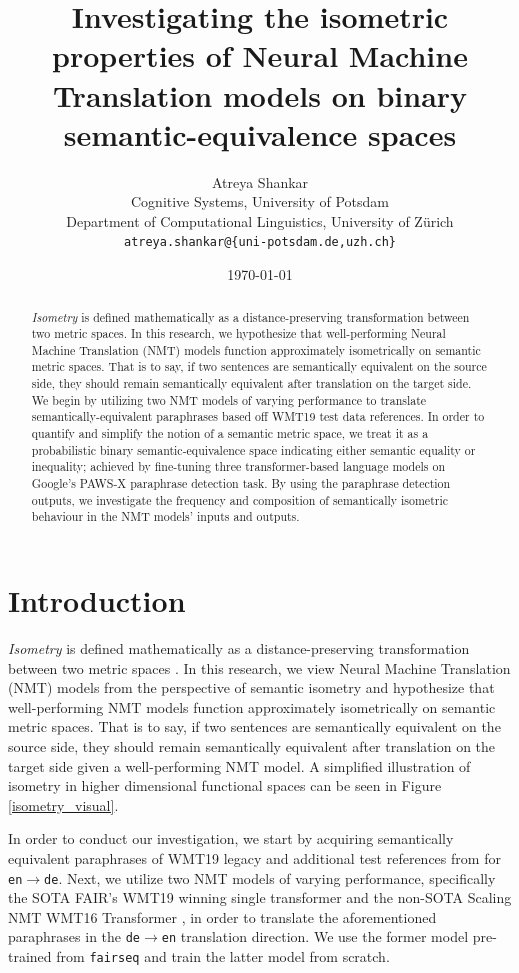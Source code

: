 \documentclass[11pt,a4paper]{article}
\title{Investigating the isometric properties of Neural Machine Translation models on binary semantic-equivalence spaces}
\author{Atreya Shankar \\
  Cognitive Systems, University of Potsdam \\
  Department of Computational Linguistics, University of Zürich \\
  \texttt{atreya.shankar@\{uni-potsdam.de,uzh.ch\}}}
\date{\today}
\begin{document}
\maketitle

\begin{abstract}
  \textit{Isometry} is defined mathematically as a distance-preserving transformation between two metric spaces. In this research, we hypothesize that well-performing Neural Machine Translation (NMT) models function approximately isometrically on semantic metric spaces. That is to say, if two sentences are semantically equivalent on the source side, they should remain semantically equivalent after translation on the target side. We begin by utilizing two NMT models of varying performance to translate semantically-equivalent paraphrases based off WMT19 test data references. In order to quantify and simplify the notion of a semantic metric space, we treat it as a probabilistic binary semantic-equivalence space indicating either semantic equality or inequality; achieved by fine-tuning three transformer-based language models on Google's PAWS-X paraphrase detection task. By using the paraphrase detection outputs, we investigate the frequency and composition of semantically isometric behaviour in the NMT models' inputs and outputs.
\end{abstract}

\section{Introduction}

\textit{Isometry} is defined mathematically as a distance-preserving transformation between two metric spaces \cite{coxeter1961introduction}. In this research, we view Neural Machine Translation (NMT) models from the perspective of semantic isometry and hypothesize that well-performing NMT models function approximately isometrically on semantic metric spaces. That is to say, if two sentences are semantically equivalent on the source side, they should remain semantically equivalent after translation on the target side given a well-performing NMT model. A simplified illustration of isometry in higher dimensional functional spaces can be seen in Figure \ref{isometry_visual}.

In order to conduct our investigation, we start by acquiring semantically equivalent paraphrases of WMT19 legacy and additional test references from \citet{freitag-bleu-paraphrase-references-2020} for \texttt{en$\rightarrow$de}. Next, we utilize two NMT models of varying performance, specifically the SOTA FAIR's WMT19 winning single transformer \cite{ng2019facebook} and the non-SOTA Scaling NMT WMT16 Transformer \cite{ott2018scaling}, in order to translate the aforementioned paraphrases in the \texttt{de$\rightarrow$en} translation direction. We use the former model pre-trained from \texttt{fairseq} \cite{ott2019fairseq} and train the latter model from scratch.
\end{document}
